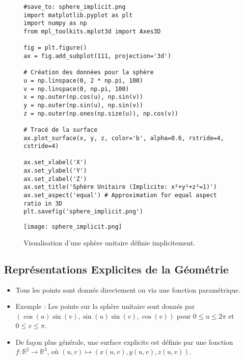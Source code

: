 \documentclass{article}
\begin{document}
\begin{figure}[H]
    \centering
    \begin{verbatim}
#save_to: sphere_implicit.png
import matplotlib.pyplot as plt
import numpy as np
from mpl_toolkits.mplot3d import Axes3D

fig = plt.figure()
ax = fig.add_subplot(111, projection='3d')

# Création des données pour la sphère
u = np.linspace(0, 2 * np.pi, 100)
v = np.linspace(0, np.pi, 100)
x = np.outer(np.cos(u), np.sin(v))
y = np.outer(np.sin(u), np.sin(v))
z = np.outer(np.ones(np.size(u)), np.cos(v))

# Tracé de la surface
ax.plot_surface(x, y, z, color='b', alpha=0.6, rstride=4, cstride=4)

ax.set_xlabel('X')
ax.set_ylabel('Y')
ax.set_zlabel('Z')
ax.set_title('Sphère Unitaire (Implicite: x²+y²+z²=1)')
ax.set_aspect('equal') # Approximation for equal aspect ratio in 3D
plt.savefig('sphere_implicit.png')
    \end{verbatim}
    \texttt{[image: sphere\_implicit.png]}
    \caption{Visualisation d'une sphère unitaire définie implicitement.}
    \label{fig:sphere_implicit}
\end{figure}

\subsection{Représentations Explicites de la Géométrie}

\begin{itemize}
    \item Tous les points sont donnés directement ou via une fonction paramétrique.
    \item Exemple : Les points sur la sphère unitaire sont donnés par \\ $(\cos(u) \sin(v), \sin(u) \sin(v), \cos(v))$ pour $0 \le u \le 2\pi$ et $0 \le v \le \pi$.
    \item De façon plus générale, une surface explicite est définie par une fonction $f: \mathbb{R}^2 \to \mathbb{R}^3$, où $(u, v) \mapsto (x(u,v), y(u,v), z(u,v))$.
\end{itemize}
\end{document}
